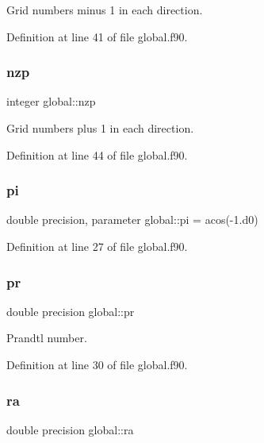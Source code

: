 Grid numbers minus 1 in each direction. 



Definition at line 41 of file global.\+f90.

\mbox{\label{namespaceglobal_ab376cd7d790b630ad83ffcded3c56366}} 
\subsubsection{\texorpdfstring{nzp}{nzp}}
{\footnotesize\ttfamily integer global\+::nzp}



Grid numbers plus 1 in each direction. 



Definition at line 44 of file global.\+f90.

\mbox{\label{namespaceglobal_a2eeeef6cb4401e0205ced808c718dead}} 
\subsubsection{\texorpdfstring{pi}{pi}}
{\footnotesize\ttfamily double precision, parameter global\+::pi = acos(-\/1.d0)}



Definition at line 27 of file global.\+f90.

\mbox{\label{namespaceglobal_a31749f11f262d021576cd0d09bdc79c2}} 
\subsubsection{\texorpdfstring{pr}{pr}}
{\footnotesize\ttfamily double precision global\+::pr}



Prandtl number. 



Definition at line 30 of file global.\+f90.

\mbox{\label{namespaceglobal_a7b363950bb58d4e52dda12a928b2b9e2}} 
\subsubsection{\texorpdfstring{ra}{ra}}
{\footnotesize\ttfamily double precision global\+::ra}



